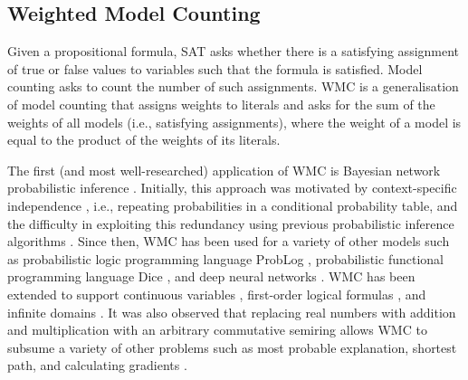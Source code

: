 \documentclass{article}
\begin{document}
\subsection{Weighted Model Counting} \label{sec:wmc}

Given a propositional formula, SAT asks whether there is a satisfying assignment
of true or false values to variables such that the formula is satisfied. Model
counting asks to count the number of such assignments. WMC
\cite{DBLP:journals/ai/ChaviraD08} is a generalisation of model counting that
assigns weights to literals and asks for the sum of the weights of all models
(i.e., satisfying assignments), where the weight of a model is equal to the
product of the weights of its literals.

The first (and most well-researched) application of WMC is Bayesian network
probabilistic inference
\cite{DBLP:conf/ecai/BartKLM16,DBLP:conf/ijcai/ChaviraD05,DBLP:conf/sat/ChaviraD06,DBLP:conf/kr/Darwiche02,DBLP:conf/aaai/SangBK05}.
Initially, this approach was motivated by context-specific independence
\cite{DBLP:conf/uai/BoutilierFGK96}, i.e., repeating probabilities in a
conditional probability table, and the difficulty in exploiting this redundancy
using previous probabilistic inference algorithms
\cite{DBLP:conf/kr/Darwiche02}. Since then, WMC has been used for a variety of
other models such as probabilistic logic programming language ProbLog
\cite{DBLP:journals/tplp/FierensBRSGTJR15,DBLP:conf/aaai/VlasselaerKDMR16},
probabilistic functional programming language Dice
\cite{DBLP:journals/pacmpl/HoltzenBM20}, and deep neural networks
\cite{DBLP:journals/corr/abs-2010-11926,DBLP:conf/icml/XuZFLB18}. WMC has been
extended to support continuous variables \cite{DBLP:conf/ijcai/BellePB15},
first-order logical formulas
\cite{DBLP:conf/ijcai/BroeckTMDR11,DBLP:journals/cacm/GogateD16}, and infinite
domains \cite{DBLP:conf/aaai/Belle17}. It was also observed that replacing real
numbers with addition and multiplication with an arbitrary commutative semiring
allows WMC to subsume a variety of other problems such as most probable
explanation, shortest path, and calculating gradients
\cite{DBLP:journals/ijar/BelleR20,DBLP:journals/japll/KimmigBR17}.
\end{document}
